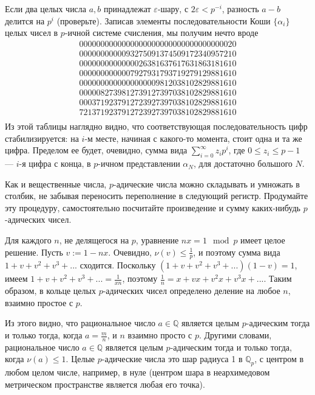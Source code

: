 \documentclass[12pt]{book}
\renewcommand{\epsilon}{\varepsilon}
\def\Q{{\mathbb Q}}
\theoremstyle{upshape}
\theoremstyle{generic}
\theoremstyle{upshapenonumber}
\newcommand{\следствие}{%
     \refstepcounter{teorema}
     {\noindent\bf Следствие \thechapter.\arabic{teorema}:\ }}
\newcommand{\пример}{%
     \refstepcounter{teorema}
     {\noindent\bf Пример \thechapter.\arabic{teorema}:\ }}
\newcommand{\лемма}{%
     \refstepcounter{teorema}
     {\noindent\bf Лемма \thechapter.\arabic{teorema}:\ }}
\newcommand{\теорема}{%
     \refstepcounter{teorema}
     {\noindent\bf Теорема \thechapter.\arabic{teorema}:\ }}
\newcommand{\утверждение}{%
     \refstepcounter{teorema}
     {\noindent\bf Утверждение \thechapter.\arabic{teorema}:\ }}
\begin{document}
Если два целых числа $a, b$ принадлежат $\epsilon$-шару, с
$2\epsilon < p^{-i}$, разность $a-b$ делится на $p^i$
(проверьте). Записав элементы последовательности Коши
$\{\alpha_i\}$ целых чисел в $p$-ичной системе счисления, мы получим 
нечто вроде
\begin{equation*}\begin{array}{c}
0000000000000000000000000000000000020\\
0000000000093275091374509172340957210\\
0000000000000026381637617631863181610\\
0000000000007927931793719279129881610\\
0000000000000000009812038102829881610\\
0000082739812739127397038102829881610\\
0003719237912723927397038102829881610\\
7213719237912723927397038102829881610\\
\end{array}
\end{equation*}
Из этой таблицы наглядно видно,
что соответствующая последовательность цифр стабилизируется:
на $i$-м месте, начиная с какого-то момента, стоит одна
и та же цифра. Пределом ее будет, очевидно, сумма вида
$\sum_{i=0}^\infty z_i p^{i}$, где $0\leq z_i\leq p-1$ --- 
$i$-я цифра с конца, в $p$-ичном представлении 
$\alpha_N$, для достаточно большого $N$.

Как и вещественные числа, $p$-адические числа 
можно складывать и умножать в столбик,
не забывая переносить переполнение в следующий регистр.
Продумайте эту процедуру, самостоятельно посчитайте
произведение и сумму каких-нибудь $p$-адических чисел.

Для каждого $n$, не делящегося на $p$, 
уравнение $nx =1 \mod p$ имеет целое решение.
Пусть $v := 1-nx$. Очевидно,  $\nu(v) \leq \frac 1 p$,
и поэтому сумма вида $1+ v + v^2 + v^3+ ...$
сходится. Поскольку $(1+ v + v^2 + v^3+ ...)(1-v)=1$,
имеем $1+ v + v^2 + v^3+ ...= \frac 1 {xn}$, 
поэтому $\frac 1 n = x + vx + v^2 x + v^3 x + ...$.
Таким образом, в кольце целых $p$-адических чисел
определено деление на любое $n$, взаимно простое с $p$.

Из этого видно, что рациональное число $a\in \Q$
является целым $p$-адическим тогда и только тогда,
когда $a= \frac m n$, и $n$ взаимно просто с $p$.
Другими словами, рациональное число $a\in \Q$
является целым $p$-адическим тогда и только тогда,
когда $\nu(a) \leq 1$. Целые $p$-адические числа
это шар радиуса 1 в $\Q_p$, с центром
в любом целом числе, например, в нуле (центром
шара в неархимедовом метрическом пространстве
является любая его точка).
\end{document}
